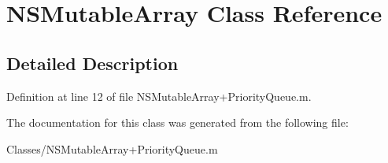 \hypertarget{class_n_s_mutable_array}{
\section{NSMutableArray Class Reference}
\label{class_n_s_mutable_array}
}


\subsection{Detailed Description}


Definition at line 12 of file NSMutableArray+PriorityQueue.m.



The documentation for this class was generated from the following file:\begin{DoxyCompactItemize}
\item 
Classes/NSMutableArray+PriorityQueue.m\end{DoxyCompactItemize}
